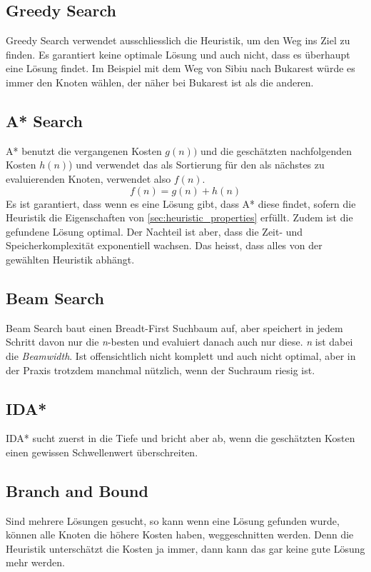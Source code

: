 \subsection{Greedy Search}
Greedy Search verwendet ausschliesslich die Heuristik, um den Weg ins Ziel zu finden. Es garantiert keine optimale Lösung und auch nicht, dass es überhaupt eine Lösung findet. Im Beispiel mit dem Weg von Sibiu nach Bukarest würde es immer den Knoten wählen, der näher bei Bukarest ist als die anderen.

\subsection{A* Search}
A* benutzt die vergangenen Kosten \(g(n))\) und die geschätzten nachfolgenden Kosten \(h(n)\)) und verwendet das als Sortierung für den als nächstes zu evaluierenden Knoten, verwendet also \(f(n)\).
\begin{displaymath}
f(n) = g(n) + h(n)
\end{displaymath}
 Es ist garantiert, dass wenn es eine Lösung gibt, dass A* diese findet, sofern die Heuristik die Eigenschaften von \ref{sec:heuristic_properties} erfüllt. Zudem ist die gefundene Lösung optimal. Der Nachteil ist aber, dass die Zeit- und Speicherkomplexität exponentiell wachsen. Das heisst, dass alles von der gewählten Heuristik abhängt.
 
 \subsection{Beam Search}
Beam Search baut einen Breadt-First Suchbaum auf, aber speichert in jedem Schritt davon nur die \textit{n}-besten und evaluiert danach auch nur diese. \textit{n} ist dabei die \textit{Beamwidth}.  Ist offensichtlich nicht komplett und auch nicht optimal, aber in der Praxis trotzdem manchmal nützlich, wenn der Suchraum riesig ist.
 
 \subsection{IDA*}
IDA* sucht zuerst in die Tiefe und bricht aber ab, wenn die geschätzten Kosten einen gewissen Schwellenwert überschreiten.
 
 \subsection{Branch and Bound}
 Sind mehrere Lösungen gesucht, so kann wenn eine Lösung gefunden wurde, können alle Knoten die höhere Kosten haben, weggeschnitten werden. Denn die Heuristik unterschätzt die Kosten ja immer, dann kann das gar keine gute Lösung mehr werden.
 

